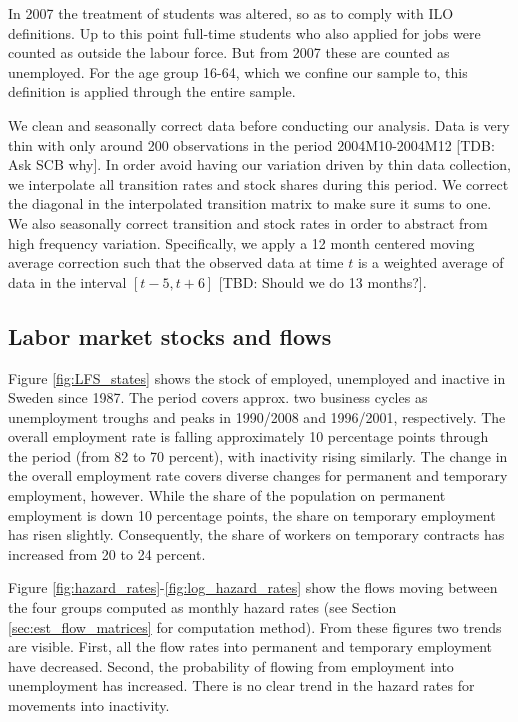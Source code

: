 In 2007 the treatment of students was altered, so as to comply with ILO definitions. Up to this point full-time students who also applied for jobs were counted as outside the labour force. But from 2007 these are counted as unemployed. For the age group 16-64, which we confine our sample to, this definition is applied through the entire sample. 

We clean and seasonally correct data before conducting our analysis. Data is very thin with only around 200 observations in the period 2004M10-2004M12 [TDB: Ask SCB why]. In order avoid having our variation driven by thin data collection, we interpolate all transition rates and stock shares during this period. We correct the diagonal in the interpolated transition matrix to make sure it sums to one. We also seasonally correct transition and stock rates in order to abstract from high frequency variation. Specifically, we apply a 12 month centered moving average correction such that the observed data at time $t$ is a weighted average of data in the interval $[t-5, t+6]$ [TBD: Should we do 13 months?]. 

\subsection{Labor market stocks and flows}
Figure \ref{fig:LFS_states} shows the stock of employed, unemployed and inactive in Sweden since 1987. The period covers approx. two business cycles as unemployment troughs and peaks in 1990/2008 and 1996/2001, respectively. The overall employment rate is falling approximately 10 percentage points through the period (from 82 to 70 percent), with inactivity rising similarly. The change in the overall employment rate covers diverse changes for permanent and temporary employment, however. While the share of the population on permanent employment is down 10 percentage points, the share on temporary employment has risen slightly. Consequently, the share of workers on temporary contracts has increased from 20 to 24 percent.

Figure \ref{fig:hazard_rates}-\ref{fig:log_hazard_rates} show the flows moving between the four groups computed as monthly hazard rates (see Section \eqref{sec:est_flow_matrices} for computation method). From these figures two trends are visible. First, all the flow rates into permanent and temporary employment have decreased. Second, the probability of flowing from employment into unemployment has increased. There is no clear trend in the hazard rates for movements into inactivity. 

